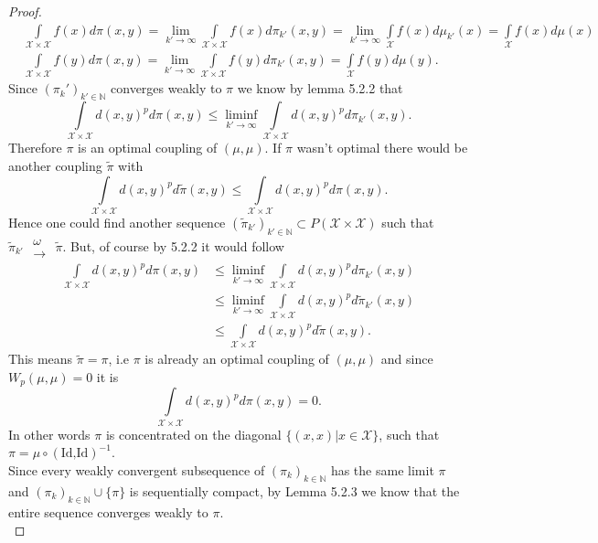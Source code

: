 \documentclass[11pt,a4paper]{article}
\begin{document}
\begin{proof}
\begin{align*}
&\int\limits_{\mathcal{X\times{}X}}f(x)d\pi(x,y) = \lim\limits_{k'\rightarrow\infty}\int\limits_{\mathcal{X\times{}X}}f(x)d\pi_{k'}(x,y) = \lim\limits_{k'\rightarrow\infty}\int\limits_{\mathcal{X}}f(x)d\mu_{k'}(x) = \int\limits_{\mathcal{X}}f(x)d\mu(x)
\\
&\int\limits_{\mathcal{X\times{}X}}f(y)d\pi(x,y) = \lim\limits_{k'\rightarrow\infty}\int\limits_{\mathcal{X\times{}X}}f(y)d\pi_{k'}(x,y) = \int\limits_{\mathcal{X}}f(y)d\mu(y).
\end{align*}
Since $(\pi_k')_{k'\in\mathbb{N}}$ converges weakly to $\pi$ we know by lemma 5.2.2 that
\[
\int\limits_{\mathcal{X\times{}X}}d(x,y)^pd\pi(x,y) \leq \liminf\limits_{k'\rightarrow\infty}\int\limits_{\mathcal{X\times{}X}}d(x,y)^pd\pi_{k'}(x,y).
\]
Therefore $\pi$ is an optimal coupling of $(\mu,\mu)$. If $\pi$ wasn't optimal there would be another coupling $\tilde{\pi}$ with 
\[
\int\limits_{\mathcal{X\times{}X}} d(x,y)^pd\tilde{\pi}(x,y) \leq \int\limits_{\mathcal{X\times{}X}} d(x,y)^pd\pi(x,y).
\]
Hence one could find another sequence $(\tilde{\pi}_{k'})_{k'\in\mathbb{N}}\subset{}P(\mathcal{X\times{}X})$ such that $\tilde{\pi}_{k'}\,\, \substack{\omega\\ \longrightarrow}\,\, \tilde{\pi}$.
But, of course by 5.2.2 it would follow  
\begin{align*}
\int\limits_{\mathcal{X\times{}X}}d(x,y)^pd\pi(x,y) &\leq \liminf\limits_{k'\rightarrow\infty}\int\limits_{\mathcal{X\times{}X}}d(x,y)^pd\pi_{k'}(x,y) \\& \leq \liminf\limits_{k'\rightarrow\infty}\int\limits_{\mathcal{X\times{}X}}d(x,y)^pd\tilde{\pi}_{k'}(x,y) \\& \leq \int\limits_{\mathcal{X\times{}X}}d(x,y)^pd\tilde{\pi}(x,y).
\end{align*}
This means $\tilde{\pi}=\pi$, i.e $\pi$ is already an optimal coupling of $(\mu,\mu)$ and since $W_p(\mu,\mu)=0$ it is 
\[
\int\limits_{\mathcal{X\times{}X}}d(x,y)^pd\pi(x,y)=0.
\]
In other words $\pi$ is concentrated on the diagonal $\{(x,x)|x\in\mathcal{X}\}$, such that $\pi=\mu\circ{}(\text{Id,Id})^{-1}.$\vspace{1em}\\
Since every weakly convergent subsequence of $(\pi_k)_{k\in\mathbb{N}}$ has the same limit $\pi$ and $(\pi_k)_{k\in\mathbb{N}}\cup\{\pi\}$ is sequentially compact, by Lemma 5.2.3 we know that the entire sequence converges weakly to $\pi$. \vspace{1em}\\

\end{proof}
\end{document}
